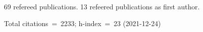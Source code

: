 69 refereed publications. 13 refeered publications as first author.

Total citations~=~2233; h-index~=~23 (2021-12-24)